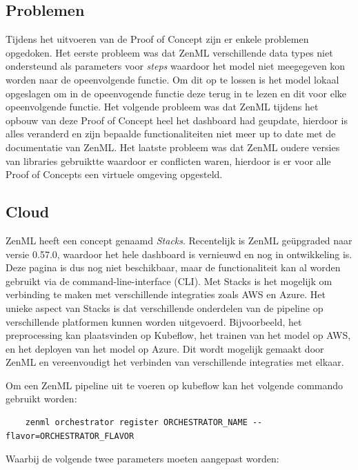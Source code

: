 \subsection{Problemen}
Tijdens het uitvoeren van de Proof of Concept zijn er enkele problemen opgedoken.
Het eerste probleem was dat ZenML verschillende data types niet ondersteund als parameters voor \textit{steps} waardoor het model niet meegegeven kon worden naar de opeenvolgende functie. Om dit op te lossen is het model lokaal opgeslagen om in de opeenvogende functie deze terug in te lezen en dit voor elke opeenvolgende functie.
Het volgende probleem was dat ZenML tijdens het opbouw van deze Proof of Concept heel het dashboard had geupdate, hierdoor is alles veranderd en zijn bepaalde functionaliteiten niet meer up to date met de documentatie van ZenML.
Het laatste probleem was dat ZenML oudere versies van libraries gebruiktte waardoor er conflicten waren, hierdoor is er voor alle Proof of Concepts een virtuele omgeving opgesteld.
\subsection{Cloud}
ZenML heeft een concept genaamd \textit{Stacks}. Recentelijk is ZenML geüpgraded naar versie 0.57.0, waardoor het hele dashboard is vernieuwd en nog in ontwikkeling is. Deze pagina is dus nog niet beschikbaar, maar de functionaliteit kan al worden gebruikt via de command-line-interface (CLI).
Met Stacks is het mogelijk om verbinding te maken met verschillende integraties zoals AWS en Azure. Het unieke aspect van Stacks is dat verschillende onderdelen van de pipeline op verschillende platformen kunnen worden uitgevoerd. Bijvoorbeeld, het preprocessing kan plaatsvinden op Kubeflow, het trainen van het model op AWS, en het deployen van het model op Azure. Dit wordt mogelijk gemaakt door ZenML en vereenvoudigt het verbinden van verschillende integraties met elkaar.

Om een ZenML pipeline uit te voeren op kubeflow kan het volgende commando gebruikt worden:
\begin{verbatim}
    zenml orchestrator register ORCHESTRATOR_NAME --flavor=ORCHESTRATOR_FLAVOR
\end{verbatim}
Waarbij de volgende twee parameters moeten aangepast worden:

